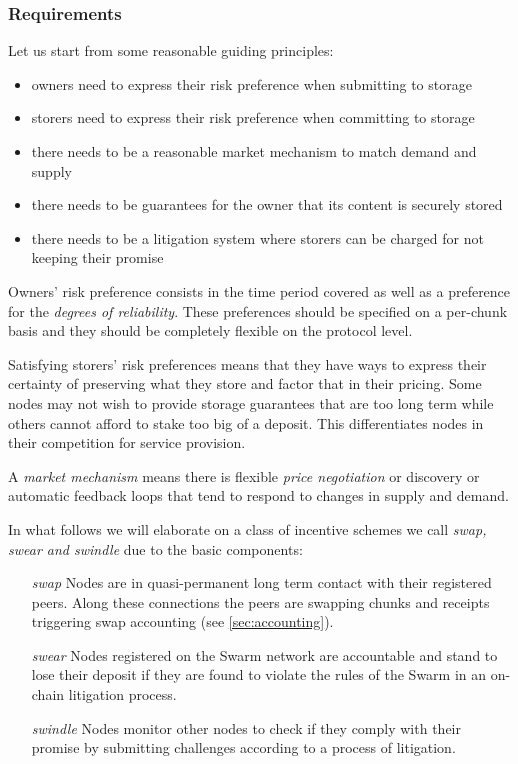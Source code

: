 \subsubsection{Requirements}

Let us start from some reasonable guiding principles:

\begin{itemize}
\item owners need to express their risk preference when submitting to storage
\item storers need to express their risk preference when committing to storage
\item there needs to be a reasonable market mechanism to match demand and supply
\item there needs to be guarantees  for the owner that its content is securely stored
\item there needs to be a litigation system where storers can be charged for not keeping their promise
\end{itemize}

Owners' risk preference consists in the time period covered as well as a preference for the \emph{degrees of reliability}. These preferences should be specified on a per-chunk basis and they should be completely flexible on the protocol level.

Satisfying storers' risk preferences means that they have ways to express their certainty of preserving what they store and factor that in their pricing. Some nodes may not wish to provide storage guarantees that are too long term while others cannot afford to stake too big of a deposit. This differentiates nodes in their competition for service provision.

A \emph{market mechanism} means there is flexible \emph{price negotiation} or discovery or automatic feedback loops that tend to respond to changes in supply and demand.

In what follows we will elaborate on a class of incentive schemes we call \emph{swap, swear and swindle} due to the basic components:

\begin{itemize}
\item [\emph{swap}]
  Nodes are in quasi-permanent long term contact with their registered peers. Along these connections the peers are swapping chunks and receipts triggering swap accounting (see \ref{sec:accounting}).
  
\item [\emph{swear}]
  Nodes registered on the Swarm network are accountable and stand to lose their deposit if they are found to violate the rules of the Swarm in an on-chain litigation process.

\item [\emph{swindle}]
  Nodes monitor other nodes to check if they comply with their promise by submitting challenges according to a process of litigation.

\end{itemize}

